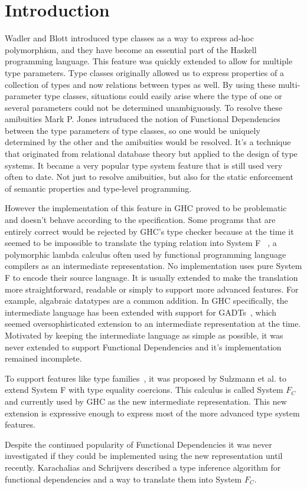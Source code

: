 \section{Introduction}
Wadler and Blott \cite{Wadler:1989:MAP:75277.75283} introduced type classes as a
way to express ad-hoc polymorphism, and they have become an essential part of the Haskell
programming language. This feature was quickly extended to allow for multiple
type parameters. Type classes originally allowed us to express properties of a
collection of types and now relations between types as well. By using
these multi-parameter type classes, situations could easily arise where the type
of one or several parameters could not be determined unambiguously. To resolve
these amibuities Mark P. Jones intruduced the notion of Functional Dependencies
\cite{Jones00typeclasses} between the type parameters of type classes, so one
would be uniquely determined by the other and the amibuities would be resolved.
It's a technique that originated from relational database theory but applied to
the design of type systems. It became a very popular type system feature that is
still used very often to date. Not just to resolve amibuities, but also for the
static enforcement of semantic properties and type-level programming.

However the implementation of this feature in GHC proved to be problematic and
doesn't behave according to the specification.  Some programs that are entirely
correct
would be rejected by GHC's type checker because at the time it seemed to be
impossible to translate the typing relation into System
F~\cite{Sulzmann:2007:SFT:1190315.1190324}\cite{Karachalias:2017:EFD:3156695.3122966}
, a polymorphic
lambda calculus often used by functional programming language compilers as an
intermediate representation. No implementation uses pure System F to encode
their source language. It is usually extended to make the translation more
straightforward, readable or simply to support more advanced features. For
example, algabraic datatypes are a common addition. In GHC specifically, the intermediate language has been extended
with support for GADTs~\cite{Sulzmann:2007:SFT:1190315.1190324}, which seemed oversophisticated extension to an
intermediate representation at the time. Motivated by
keeping the intermediate language as simple as possible, it was never extended
to support Functional Dependencies and it's implementation remained incomplete.

To support features like type
families~\cite{Karachalias:2017:EFD:3156695.3122966}, it was proposed by
Sulzmann et al. \cite{Sulzmann:2007:SFT:1190315.1190324} to extend System F with
type equality coercions. This calculus is called System $F_C$ and currently used by
GHC as the new intermediate representation. This new extension is expressive
enough to express most of the more advanced type system features.

Despite the continued popularity of Functional Dependencies it was never
investigated if they could be implemented using the new representation until
recently. Karachalias and Schrijvers \cite{Karachalias:2017:EFD:3156695.3122966}
described a type inference algorithm for functional dependencies and a way to
translate them into System $F_C$.
